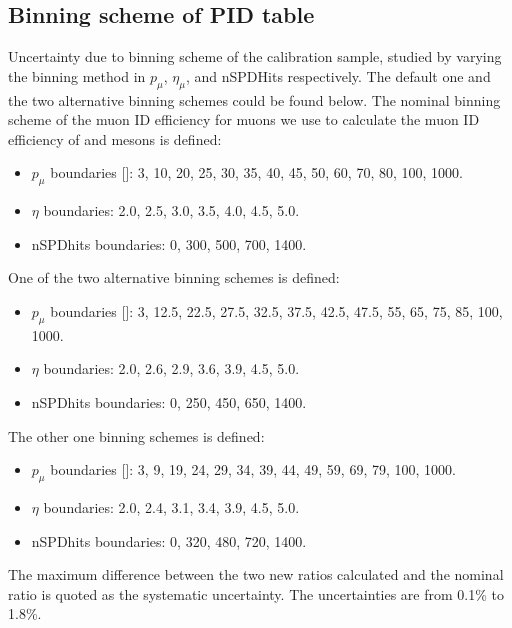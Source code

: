 \subsection{Binning scheme of PID table}
Uncertainty due to binning scheme of the calibration sample, studied by varying the binning method in $p_\mu$, $\eta_\mu$, and nSPDHits respectively. The default one and the two alternative binning schemes could be found below. The nominal binning scheme of the muon ID efficiency for muons we use to calculate the muon ID efficiency of \jpsi and \psitwos mesons is defined:
\begin{itemize}
  \item $p_\mu$ boundaries [\gevc]: 3, 10, 20, 25, 30, 35, 40, 45, 50, 60, 70, 80, 100, 1000.
  \item $\eta$ boundaries: 2.0, 2.5, 3.0, 3.5, 4.0, 4.5, 5.0.
  \item nSPDhits boundaries: 0, 300, 500, 700, 1400.
\end{itemize}

One of the two alternative binning schemes is defined:
\begin{itemize}
  \item $p_\mu$ boundaries [\gevc]: 3, 12.5, 22.5, 27.5, 32.5, 37.5, 42.5, 47.5, 55, 65, 75, 85, 100, 1000.
  \item $\eta$ boundaries: 2.0, 2.6, 2.9, 3.6, 3.9, 4.5, 5.0.
  \item nSPDhits boundaries: 0, 250, 450, 650, 1400.
\end{itemize}

The other one binning schemes is defined:
\begin{itemize}
  \item $p_\mu$ boundaries [\gevc]: 3, 9, 19, 24, 29, 34, 39, 44, 49, 59, 69, 79, 100, 1000.
  \item $\eta$ boundaries: 2.0, 2.4, 3.1, 3.4, 3.9, 4.5, 5.0.
  \item nSPDhits boundaries: 0, 320, 480, 720, 1400.
\end{itemize}
The maximum difference between the two new ratios calculated and the nominal ratio is quoted as the systematic uncertainty. The uncertainties are from 0.1\% to 1.8\%.

